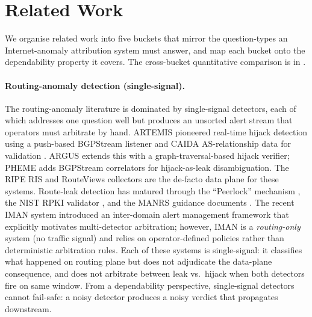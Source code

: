 
\section{Related Work}
\label{sec:related}

We organise related work into five buckets that mirror
the question-types an Internet-anomaly attribution
system must answer, and map each bucket onto the
dependability property it covers. The cross-bucket
quantitative comparison is in .

\paragraph{Routing-anomaly detection (single-signal).}
The routing-anomaly literature is dominated by
single-signal detectors, each of which addresses one
question well but produces an unsorted alert stream
that operators must arbitrate by hand. ARTEMIS
\cite{artemis-2018} pioneered real-time hijack
detection using a push-based BGPStream listener and
CAIDA AS-relationship data for validation
\cite{caida-bgpstream-2016}. ARGUS \cite{argus-2019}
extends this with a graph-traversal-based hijack
verifier; PHEME \cite{pheme-2020} adds BGPStream
correlators for hijack-as-leak disambiguation.
The RIPE RIS \cite{ripe-ris-2023} and
RouteViews \cite{routeviews-2003} collectors are
the de-facto data plane for these systems. Route-leak
detection has matured through the ``Peerlock''
mechanism \cite{manrs-2024,peerlock}, the NIST RPKI
validator \cite{rpki-validator,toorop-rpki-imc-2020,
krerelay-2019}, and the MANRS guidance documents
\cite{manrs-2024}. The recent IMAN system
\cite{iman-2022} introduced an inter-domain alert
management framework that explicitly motivates
multi-detector arbitration; however, IMAN is a
\emph{routing-only} system (no traffic signal) and
relies on operator-defined policies rather than
deterministic arbitration rules. Each of these
systems is single-signal: it classifies what
happened on routing plane but does not
adjudicate the data-plane consequence, and does not
arbitrate between leak vs.\ hijack when both
detectors fire on same window. From a
dependability perspective, single-signal detectors
cannot fail-safe: a noisy detector produces a
noisy verdict that propagates downstream.

